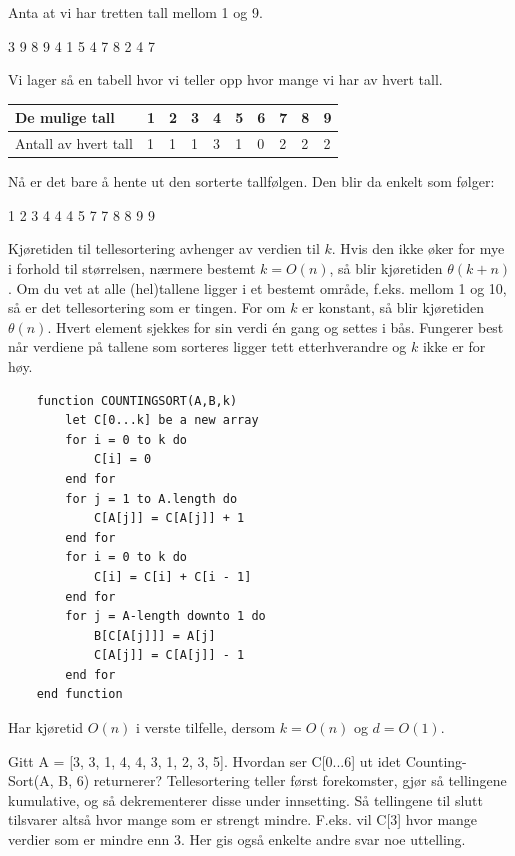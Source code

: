 \begin{boxed}
Anta at vi har tretten tall mellom 1 og 9.
\begin{center}
3 9 8 9 4 1 5 4 7 8 2 4 7
\end{center}
Vi lager så en tabell hvor vi teller opp hvor mange vi har av hvert tall.

\begin{table}[H]
    \label{tab:tellesortering}
    \centering
    \begin{tabular}{|L{10em} | L{2em}|L{2em}|L{2em}|L{2em}|L{2em}|L{2em}|L{2em}|L{2em}|L{2em}|}
        \hline
        De mulige tall & 1 & 2 & 3 & 4 & 5 & 6 & 7 & 8 & 9\\
        \hline
        Antall av hvert tall & 1 & 1 & 1 & 3 & 1 & 0 & 2 & 2 & 2\\
         \hline
    \end{tabular}
\end{table}
Nå er det bare å hente ut den sorterte tallfølgen. Den blir da enkelt som følger:
\begin{center}
1 2 3 4 4 4 5 7 7 8 8 9 9
\end{center}
\end{boxed}

\noindent Kjøretiden til tellesortering avhenger av verdien til $k$. Hvis den ikke øker for mye i forhold til størrelsen, nærmere bestemt $k = O(n)$, så blir kjøretiden $\theta(k + n)$. Om du vet at alle (hel)tallene ligger i et bestemt område, f.eks. mellom 1 og 10, så er det tellesortering som er tingen. For om $k$ er konstant, så blir kjøretiden $\theta(n)$. Hvert element sjekkes for sin verdi én gang og settes i bås. Fungerer best når verdiene på tallene som sorteres ligger tett etterhverandre og $k$ ikke er for høy.

\begin{lstlisting}
    function COUNTINGSORT(A,B,k)
	    let C[0...k] be a new array
    	for i = 0 to k do
    		C[i] = 0
    	end for
    	for j = 1 to A.length do
    		C[A[j]] = C[A[j]] + 1
    	end for
    	for i = 0 to k do
    		C[i] = C[i] + C[i - 1]
    	end for
    	for j = A-length downto 1 do
    		B[C[A[j]]] = A[j]
    		C[A[j]] = C[A[j]] - 1
    	end for
    end function
\end{lstlisting}

\noindent Har kjøretid $O(n)$ i verste tilfelle, dersom $k = O(n)$ og $d = O(1)$.\\

\begin{boxed}
Gitt A = [3, 3, 1, 4, 4, 3, 1, 2, 3, 5]. Hvordan ser C[0...6] ut idet Counting-Sort(A, B, 6) returnerer?
\newline\newline
[0, 0, 2, 3, 7, 9, 10] \newline\newline  Tellesortering teller først forekomster, gjør så tellingene kumulative, og så dekrementerer disse under innsetting. Så tellingene til slutt tilsvarer altså hvor mange som er strengt mindre. F.eks. vil C[3] hvor mange verdier som er mindre enn 3. Her gis også enkelte andre svar noe uttelling.
\end{boxed}

